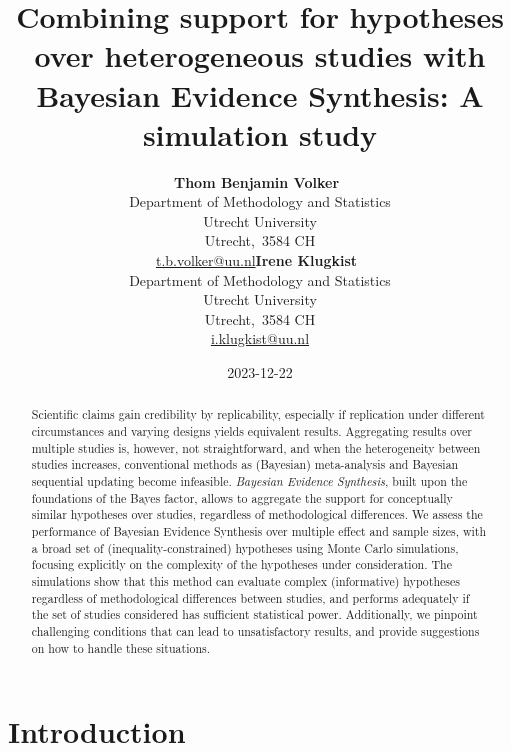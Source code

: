 \documentclass[
]{article}
\title{Combining support for hypotheses over heterogeneous studies with
Bayesian Evidence Synthesis: A simulation study}
\author{\textbf{Thom Benjamin
Volker}~\orcidlink{0000-0002-2408-7820}\\Department of Methodology and
Statistics\\Utrecht University\\Utrecht,\ 3584
CH\\\href{mailto:t.b.volker@uu.nl}{t.b.volker@uu.nl}\asep\textbf{Irene
Klugkist}~\orcidlink{0000-0001-9561-3691}\\Department of Methodology and
Statistics\\Utrecht University\\Utrecht,\ 3584
CH\\\href{mailto:i.klugkist@uu.nl}{i.klugkist@uu.nl}}
\date{2023-12-22}
\begin{document}
\maketitle
\begin{abstract}
Scientific claims gain credibility by replicability, especially if
replication under different circumstances and varying designs yields
equivalent results. Aggregating results over multiple studies is,
however, not straightforward, and when the heterogeneity between studies
increases, conventional methods as (Bayesian) meta-analysis and Bayesian
sequential updating become infeasible. \emph{Bayesian Evidence
Synthesis}, built upon the foundations of the Bayes factor, allows to
aggregate the support for conceptually similar hypotheses over studies,
regardless of methodological differences. We assess the performance of
Bayesian Evidence Synthesis over multiple effect and sample sizes, with
a broad set of (inequality-constrained) hypotheses using Monte Carlo
simulations, focusing explicitly on the complexity of the hypotheses
under consideration. The simulations show that this method can evaluate
complex (informative) hypotheses regardless of methodological
differences between studies, and performs adequately if the set of
studies considered has sufficient statistical power. Additionally, we
pinpoint challenging conditions that can lead to unsatisfactory results,
and provide suggestions on how to handle these situations.
\end{abstract}
\ifdefined\Shaded\renewenvironment{Shaded}{\begin{tcolorbox}[breakable, frame hidden, enhanced, interior hidden, boxrule=0pt, sharp corners, borderline west={3pt}{0pt}{shadecolor}]}{\end{tcolorbox}}\fi

\hypertarget{introduction}{%
\section{Introduction}\label{introduction}}
\end{document}
